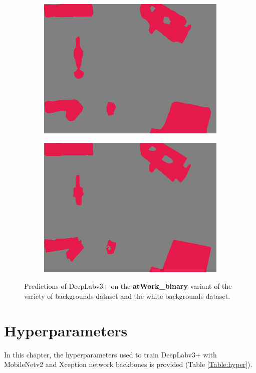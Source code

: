 \begin{figure}[h]
\begin{subfigure}{.24\textwidth}
			\includegraphics[width=1\linewidth]{images/sample_predictions/00017_mob_binary_pred}
		\end{subfigure}
		\begin{subfigure}{.24\textwidth}
			\centering
			\includegraphics[width=1\linewidth]{images/sample_predictions/00017_xcep_binary_pred}
		\end{subfigure}
		\caption{Predictions of DeepLabv3+ on the \textbf{atWork\_binary} variant of the variety of backgrounds dataset and the white backgrounds dataset.}
		\label{Fig:sam_bin}
	\end{figure}

\chapter{Hyperparameters}
In this chapter, the hyperparameters used to train DeepLabv3+ with MobileNetv2 and Xception network backbones is provided (Table \ref{Table:hyper}).

